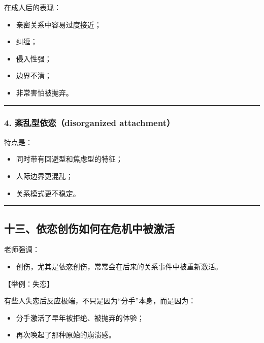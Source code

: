 \documentclass[
  chinese,
  9pt,
  a4paper,
]{ctexart}
\providecommand{\tightlist}{%
  \setlength{\itemsep}{0pt}\setlength{\parskip}{0pt}}
\begin{document}
在成人后的表现：

\begin{itemize}
\tightlist
\item
  亲密关系中容易过度接近；
\item
  纠缠；
\item
  侵入性强；
\item
  边界不清；
\item
  非常害怕被抛弃。
\end{itemize}

\begin{center}\rule{0.5\linewidth}{0.5pt}\end{center}

\subsubsection{4. 紊乱型依恋（disorganized
attachment）}\label{ux7d0aux4e71ux578bux4f9dux604bdisorganized-attachment}

特点是：

\begin{itemize}
\tightlist
\item
  同时带有回避型和焦虑型的特征；
\item
  人际边界更混乱；
\item
  关系模式更不稳定。
\end{itemize}

\begin{center}\rule{0.5\linewidth}{0.5pt}\end{center}

\subsection{十三、依恋创伤如何在危机中被激活}\label{ux5341ux4e09ux4f9dux604bux521bux4f24ux5982ux4f55ux5728ux5371ux673aux4e2dux88abux6fc0ux6d3b}

老师强调：

\begin{itemize}
\tightlist
\item
  创伤，尤其是依恋创伤，常常会在后来的关系事件中被重新激活。
\end{itemize}

【举例：失恋】

有些人失恋后反应极端，不只是因为``分手''本身，而是因为：

\begin{itemize}
\tightlist
\item
  分手激活了早年被拒绝、被抛弃的体验；
\item
  再次唤起了那种原始的崩溃感。
\end{itemize}
\end{document}
